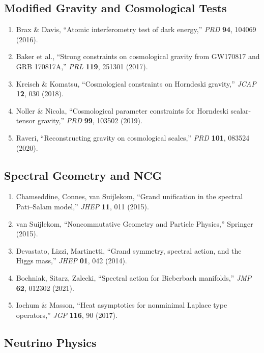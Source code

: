 \documentclass[11pt,a4paper]{article}
\begin{document}
\subsection{Modified Gravity and Cosmological Tests}

\begin{enumerate}[resume]
\item Brax \& Davis, ``Atomic interferometry test of dark energy,'' \textit{PRD} \textbf{94}, 104069 (2016).
\item Baker et al., ``Strong constraints on cosmological gravity from GW170817 and GRB 170817A,'' \textit{PRL} \textbf{119}, 251301 (2017).
\item Kreisch \& Komatsu, ``Cosmological constraints on Horndeski gravity,'' \textit{JCAP} \textbf{12}, 030 (2018).
\item Noller \& Nicola, ``Cosmological parameter constraints for Horndeski scalar-tensor gravity,'' \textit{PRD} \textbf{99}, 103502 (2019).
\item Raveri, ``Reconstructing gravity on cosmological scales,'' \textit{PRD} \textbf{101}, 083524 (2020).
\end{enumerate}

\subsection{Spectral Geometry and NCG}

\begin{enumerate}[resume]
\item Chamseddine, Connes, van Suijlekom, ``Grand unification in the spectral Pati--Salam model,'' \textit{JHEP} \textbf{11}, 011 (2015).
\item van Suijlekom, ``Noncommutative Geometry and Particle Physics,'' Springer (2015).
\item Devastato, Lizzi, Martinetti, ``Grand symmetry, spectral action, and the Higgs mass,'' \textit{JHEP} \textbf{01}, 042 (2014).
\item Bochniak, Sitarz, Zalecki, ``Spectral action for Bieberbach manifolds,'' \textit{JMP} \textbf{62}, 012302 (2021).
\item Iochum \& Masson, ``Heat asymptotics for nonminimal Laplace type operators,'' \textit{JGP} \textbf{116}, 90 (2017).
\end{enumerate}

\subsection{Neutrino Physics}
\end{document}
